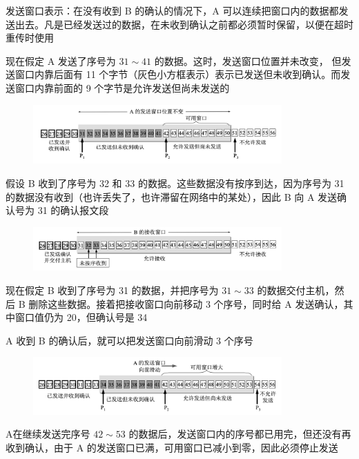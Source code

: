 \documentclass[cs4size,a4paper,10pt]{ctexart}
\begin{document}
	发送窗口表示：在没有收到 B 的确认的情况下，A 可以连续把窗口内的数据都发送出去。凡是已经发送过的数据，在未收到确认之前都必须暂时保留，以便在超时重传时使用

	现在假定 A 发送了序号为 $31\sim 41$ 的数据。这时，发送窗口位置并未改变， 但发送窗口内靠后面有 11 个字节（灰色小方框表示）表示已发送但未收到确认。而发送窗口内靠前面的 9 个字节是允许发送但尚未发送的

	\begin{figure}[H]
		\centering
		\includegraphics[width=0.85\textwidth]{img/5.16.1}
	\end{figure}

	假设 B 收到了序号为 32 和 33 的数据。这些数据没有按序到达，因为序号为 31 的数据没有收到（也许丢失了，也许滞留在网络中的某处），因此 B 向 A 发送确认号为 31 的确认报文段

	\begin{figure}[H]
		\centering
		\includegraphics[width=0.85\textwidth]{img/5.16.2}
	\end{figure}

	现在假定 B 收到了序号为 31 的数据，并把序号为 $31\sim 33$ 的数据交付主机，然后 B 删除这些数据。接着把接收窗口向前移动 3 个序号，同时给 A 发送确认，其中窗口值仍为 20，但确认号是 34

	A 收到 B 的确认后，就可以把发送窗口向前滑动 3 个序号

	\begin{figure}[H]
		\centering
		\includegraphics[width=0.85\textwidth]{img/5.17.1}
	\end{figure}

	A在继续发送完序号 $42\sim 53$ 的数据后，发送窗口内的序号都已用完，但还没有再收到确认，由于 A 的发送窗口已满，可用窗口已减小到零，因此必须停止发送
\end{document}
